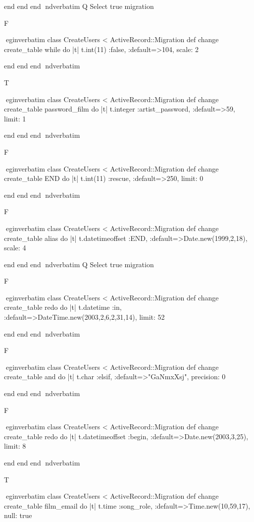     end 
  end 
end
nd{verbatim}
Q
 Select true migration

F

egin{verbatim}
 class CreateUsers < ActiveRecord::Migration 
  def change 
    create_table while do |t| 
      t.int(11) :false, :default=>104, scale: 2
    
    end 
  end 
end
nd{verbatim}

T

egin{verbatim}
 class CreateUsers < ActiveRecord::Migration 
  def change 
    create_table password_film do |t| 
      t.integer :artist_password, :default=>59, limit: 1
    
    end 
  end 
end
nd{verbatim}

F

egin{verbatim}
 class CreateUsers < ActiveRecord::Migration 
  def change 
    create_table END do |t| 
      t.int(11) :rescue, :default=>250, limit: 0
    
    end 
  end 
end
nd{verbatim}

F

egin{verbatim}
 class CreateUsers < ActiveRecord::Migration 
  def change 
    create_table alias do |t| 
      t.datetimeoffset :END, :default=>Date.new(1999,2,18), scale: 4
    
    end 
  end 
end
nd{verbatim}
Q
 Select true migration

F

egin{verbatim}
 class CreateUsers < ActiveRecord::Migration 
  def change 
    create_table redo do |t| 
      t.datetime :in, :default=>DateTime.new(2003,2,6,2,31,14), limit: 52
    
    end 
  end 
end
nd{verbatim}

F

egin{verbatim}
 class CreateUsers < ActiveRecord::Migration 
  def change 
    create_table and do |t| 
      t.char :elsif, :default=>"GaNmxXsj", precision: 0
    
    end 
  end 
end
nd{verbatim}

F

egin{verbatim}
 class CreateUsers < ActiveRecord::Migration 
  def change 
    create_table redo do |t| 
      t.datetimeoffset :begin, :default=>Date.new(2003,3,25), limit: 8
    
    end 
  end 
end
nd{verbatim}

T

egin{verbatim}
 class CreateUsers < ActiveRecord::Migration 
  def change 
    create_table film_email do |t| 
      t.time :song_role, :default=>Time.new(10,59,17), null: true
    
